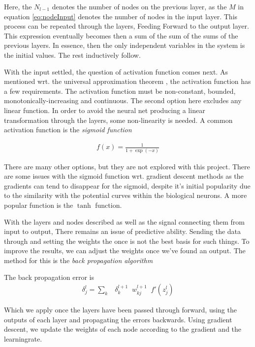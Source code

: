 \documentclass[10pt]{article}
\begin{document}
Here, the $N_{l-1}$ denotes the number of nodes on the previous layer, as the
$M$ in equation \ref{eq:nodeInput} denotes the number of nodes in the input
layer. This process can be repeated through the layers, Feeding Forward to the
output layer. This expression eventually becomes then a sum of the sum of the
sums of the previous layers. In essence, then the only independent variables in
the system is the initial values. The rest inductively follow. 

With the input settled, the question of activation function comes next. As
mentioned wrt. the universal approximation theorem , the activation function
has a few requirements. The activation function must be non-constant, bounded,
monotonically-increasing and continuous. The second option here excludes any linear
function. In order to avoid the neural net producing a linear transformation through the layers, 
some non-linearity is needed. A common activation function is the \emph{sigmoid function}

\begin{align}
	f(x) = \frac{1}{1 + \exp(-x)}
	\label{eq:sigmoid}
\end{align}

There are many other options, but they are not explored with this project.
There are some issues with the sigmoid function wrt. gradient descent methods
as the gradients can tend to disappear for the sigmoid, despite it's initial
popularity due to the similarity with the potential curves within the
biological neurons. A more popular function is the $\tanh$ function. 

With the layers and nodes described as well as the signal connecting them from input to 
output, There remains an issue of predictive ability. Sending the data through and setting the weights 
the once is not the best basis for such things. To improve the results, we can adjust the weights once
we've found an output. The method for this is the \emph{back propagation algorithm}

The back propagation error is
\begin{align}
	\delta^l_j = \sum_k \;\;\;\delta^{l+1}_k \;\; w^{l+1}_{kj} \;\; f'(z^l_j)
\end{align}

Which we apply once the layers have been passed through forward, using the outputs of each layer and
propagating the errors backwards. Using gradient descent, we update the weights of each node according
to the gradient and the learningrate. 
\end{document}
